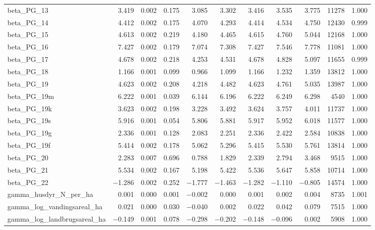 \documentclass[12pt]{article}
\begin{document}
\begin{longtable}{lrrrrrrrrrr}
beta\_PG\_13  &  3.419 & 0.002 & 0.175 &  3.085 &  3.302 &  3.416 &  3.535 &  3.775 & 11278 & 1.000 \\
beta\_PG\_14  &  4.412 & 0.002 & 0.175 &  4.070 &  4.293 &  4.414 &  4.534 &  4.750 & 12430 & 0.999 \\
beta\_PG\_15  &  4.613 & 0.002 & 0.219 &  4.180 &  4.465 &  4.615 &  4.760 &  5.044 & 12168 & 1.000 \\
beta\_PG\_16  &  7.427 & 0.002 & 0.179 &  7.074 &  7.308 &  7.427 &  7.546 &  7.778 & 11081 & 1.000 \\
beta\_PG\_17  &  4.678 & 0.002 & 0.218 &  4.253 &  4.531 &  4.678 &  4.828 &  5.097 & 11655 & 0.999 \\
beta\_PG\_18  &  1.166 & 0.001 & 0.099 &  0.966 &  1.099 &  1.166 &  1.232 &  1.359 & 13812 & 1.000 \\
beta\_PG\_19  &  4.623 & 0.002 & 0.208 &  4.218 &  4.482 &  4.623 &  4.761 &  5.035 & 13987 & 1.000 \\
beta\_PG\_19m &  6.222 & 0.001 & 0.039 &  6.144 &  6.196 &  6.222 &  6.249 &  6.298 &  4540 & 1.000 \\
beta\_PG\_19k &  3.623 & 0.002 & 0.198 &  3.228 &  3.492 &  3.624 &  3.757 &  4.011 & 11737 & 1.000 \\
beta\_PG\_19s &  5.916 & 0.001 & 0.054 &  5.806 &  5.881 &  5.917 &  5.952 &  6.018 & 11577 & 1.000 \\
beta\_PG\_19g &  2.336 & 0.001 & 0.128 &  2.083 &  2.251 &  2.336 &  2.422 &  2.584 & 10838 & 1.000 \\
beta\_PG\_19f &  5.414 & 0.002 & 0.178 &  5.062 &  5.296 &  5.415 &  5.530 &  5.761 & 13814 & 1.000 \\
beta\_PG\_20  &  2.283 & 0.007 & 0.696 &  0.788 &  1.829 &  2.339 &  2.794 &  3.468 &  9515 & 1.000 \\
beta\_PG\_21  &  5.534 & 0.002 & 0.167 &  5.198 &  5.422 &  5.536 &  5.647 &  5.858 & 10714 & 1.000 \\
beta\_PG\_22  & $-$1.286 & 0.002 & 0.252 & $-$1.777 & $-$1.463 & $-$1.282 & $-$1.110 & $-$0.805 & 14574 & 1.000 \\
\addlinespace
gamma\_husdyr\_N\_per\_ha        &  0.001 & 0.000 & 0.001 & $-$0.002 &  0.000 &  0.001 &  0.002 &  0.004 &  8735 & 1.001 \\
gamma\_log\_vandingsareal\_ha   &  0.021 & 0.000 & 0.030 & $-$0.040 &  0.002 &  0.022 &  0.042 &  0.079 &  7515 & 1.000 \\
gamma\_log\_landbrugsareal\_ha  & $-$0.149 & 0.001 & 0.078 & $-$0.298 & $-$0.202 & $-$0.148 & $-$0.096 &  0.002 &  5908 & 1.000 \\

\end{longtable}
\end{document}
